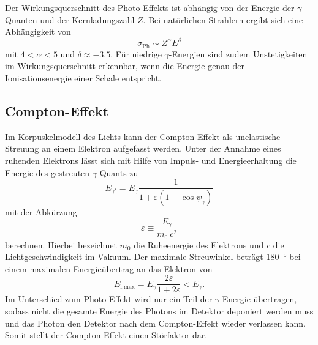 Der Wirkungsquerschnitt des Photo-Effekts ist abhängig von der Energie der
$\gamma$-Quanten und der Kernladungszahl $Z$.
Bei natürlichen Strahlern ergibt sich eine Abhängigkeit von
\begin{equation*}
	\sigma_\text{Ph} \sim Z^\alpha E^\delta
\end{equation*}
mit $4 < \alpha < 5$ und $\delta \approx \num{-3.5}$.
Für niedrige $\gamma$-Energien sind zudem Unstetigkeiten im Wirkungsquerschnitt
erkennbar, wenn die Energie genau der Ionisationsenergie einer Schale entspricht.

\subsection{Compton-Effekt}
\label{sec:Compton-Effekt}

Im Korpuskelmodell des Lichts kann der Compton-Effekt als unelastische
Streuung an einem Elektron aufgefasst werden.
Unter der Annahme eines ruhenden Elektrons lässt sich mit Hilfe von Impuls-
und Energieerhaltung die Energie des gestreuten $\gamma$-Quants zu
\begin{equation}
	E_{\gamma'} = E_\gamma
	\frac{1}{1 + \varepsilon \left(1 - \cos \psi_\gamma\right)}
	\label{eqn:Compton-Energy}
\end{equation}
mit der Abkürzung
\begin{equation*}
	\varepsilon \equiv \frac{E_\gamma}{m_\text{0}\:c^2}
\end{equation*}
berechnen.
Hierbei bezeichnet $m_0$ die Ruheenergie des Elektrons und
$c$ die Lichtgeschwindigkeit im Vakuum.
Der maximale Streuwinkel beträgt \SI{180}{\degree} bei einem maximalen
Energieübertrag an das Elektron von
\begin{equation*}
	E_\text{l,max} = E_\gamma \frac{2 \varepsilon}{1 + 2 \varepsilon} < E_\gamma.
\end{equation*}
Im Unterschied zum Photo-Effekt wird nur ein Teil der $\gamma$-Energie übertragen,
sodass nicht die gesamte Energie des Photons im Detektor deponiert werden muss und
das Photon den Detektor nach dem Compton-Effekt wieder verlassen kann.
Somit stellt der Compton-Effekt einen Störfaktor dar.

